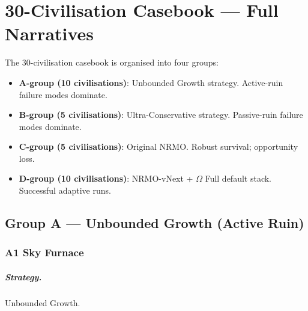 \chapter{30-Civilisation Casebook --- Full Narratives}
\label{app:civilisation-roster}


The 30-civilisation casebook is organised into four groups:

\begin{itemize}
\item \textbf{A-group (10 civilisations)}: Unbounded Growth
strategy. Active-ruin failure modes dominate.
\item \textbf{B-group (5 civilisations)}: Ultra-Conservative
strategy. Passive-ruin failure modes dominate.
\item \textbf{C-group (5 civilisations)}: Original NRMO. Robust
survival; opportunity loss.
\item \textbf{D-group (10 civilisations)}: NRMO-vNext + $\Omega$
Full default stack. Successful adaptive runs.
\end{itemize}

\section{Group A --- Unbounded Growth (Active Ruin)}
\label{sec:civ-group-a}

\subsection{A1 Sky Furnace}
\label{civ:a1}

\paragraph{Strategy.} Unbounded Growth.
